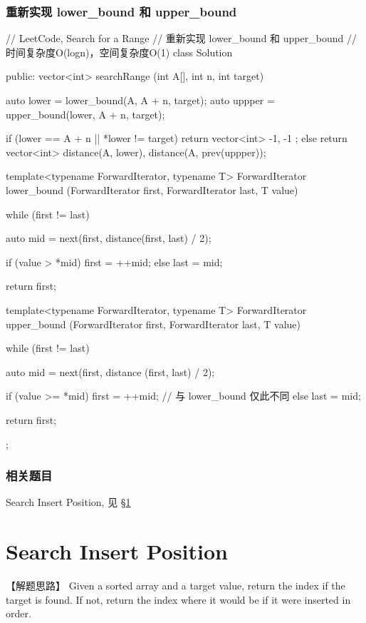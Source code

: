\subsubsection{重新实现 lower_bound 和 upper_bound}
\begin{Code}
	// LeetCode, Search for a Range
	// 重新实现 lower_bound 和 upper_bound
	// 时间复杂度O(logn)，空间复杂度O(1)
	class Solution {
		public:
		vector<int> searchRange (int A[], int n, int target) {
			auto lower = lower_bound(A, A + n, target);
			auto uppper = upper_bound(lower, A + n, target);
			
			if (lower == A + n || *lower != target)
			return vector<int> { -1, -1 };
			else
			return vector<int> {distance(A, lower), distance(A, prev(uppper))};
		}
		
		template<typename ForwardIterator, typename T>
		ForwardIterator lower_bound (ForwardIterator first,
		ForwardIterator last, T value) {
			while (first != last) {
				auto mid = next(first, distance(first, last) / 2);
				
				if (value > *mid)   first = ++mid;
				else                last = mid;
			}
			
			return first;
		}
		
		template<typename ForwardIterator, typename T>
		ForwardIterator upper_bound (ForwardIterator first,
		ForwardIterator last, T value) {
			while (first != last) {
				auto mid = next(first, distance (first, last) / 2);
				
				if (value >= *mid)   first = ++mid;  // 与 lower_bound 仅此不同
				else                 last = mid;
			}
			
			return first;
		}
	};
\end{Code}

\subsubsection{相关题目}
\begindot
\item Search Insert Position, 见 \S \ref{sec:search-insert-position}
\myenddot


\section{Search Insert Position} %
\label{sec:search-insert-position}


【解题思路】
Given a sorted array and a target value, return the index if the target is found. If not, return the index where it would be if it were inserted in order.

